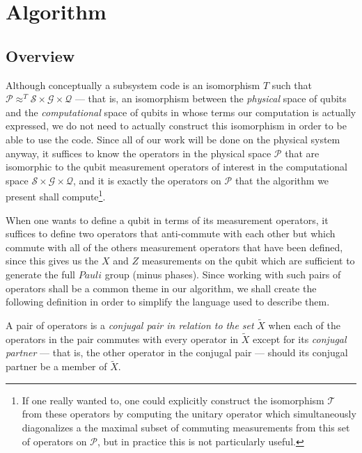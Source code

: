 \documentclass[twocolumn,showpacs,preprintnumbers,amsmath,amssymb,nofootinbib,pra,floatfix]{revtex4}
\newenvironment{definition}[1][Definition]{\begin{trivlist}
\item[\hskip \labelsep {\bfseries #1}]}{\end{trivlist}}
\newcommand{\set}{\tilde}
\begin{document}
\section{Algorithm}

\subsection{Overview}

\label{overview}

Although conceptually a subsystem code is an isomorphism $T$ such that  $\mathscr{P}\approx^T \mathscr{S}\times\mathscr{G}\times\mathscr{Q}$ --- that is, an isomorphism between the \emph{physical} space of qubits and the \emph{computational} space of qubits in whose terms our computation is actually expressed, we do not need to actually construct this isomorphism in order to be able to use the code.  Since all of our work will be done on the physical system anyway, it suffices to know the operators in the physical space $\mathscr{P}$ that are isomorphic to the qubit measurement operators of interest in the computational space $\mathscr{S}\times\mathscr{G}\times\mathscr{Q}$, and it is exactly the operators on $\mathscr{P}$ that the algorithm we present shall compute\footnote{If one really wanted to, one could explicitly construct the isomorphism $\mathscr{T}$ from these operators by computing the unitary operator which simultaneously diagonalizes a the maximal subset of commuting measurements from this set of operators on $\mathscr{P}$, but in practice this is not particularly useful.}.

When one wants to define a qubit in terms of its measurement operators, it suffices to define two operators that anti-commute with each other but which commute with all of the others measurement operators that have been defined, since this gives us the $X$ and $Z$ measurements on the qubit which are sufficient to generate the full $Pauli$ group (minus phases).  Since working with such pairs of operators shall be a common theme in our algorithm, we shall create the following definition in order to simplify the language used to describe them.

\begin{definition} A pair of operators is a \emph{conjugal pair in relation to the set} $\set X$ when each of the operators in the pair commutes with every operator in $\set X$ except for its \emph{conjugal partner} --- that is, the other operator in the conjugal pair --- should its conjugal partner be a member of $\set X$.
\end{definition}
\end{document}
